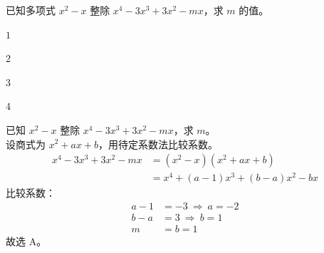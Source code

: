\documentclass[12pt,a4paper]{exam-zh}
\begin{document}
\newpage





\begin{question}
    已知多项式 $x^{2}-x$ 整除 $x^{4}-3x^{3}+3x^{2}-mx$，求 $m$ 的值。\paren[A]
    \begin{choices}
        \item $1$
        \item $2$
        \item $3$
        \item $4$
    \end{choices}
\end{question}

\begin{solution}
    已知 $x^{2}-x$ 整除 $x^{4}-3x^{3}+3x^{2}-mx$，求 $m$。 \\
    设商式为 $x^{2}+ax+b$，用待定系数法比较系数。
    \begin{align*}
        x^{4}-3x^{3}+3x^{2}-mx &= (x^{2}-x)(x^{2}+ax+b) \\
        &= x^{4}+(a-1)x^{3}+(b-a)x^{2}-bx
    \end{align*}
    比较系数：
    \begin{align*}
        a-1 &= -3 \ \Rightarrow \ a=-2 \\
        b-a &= 3 \ \Rightarrow \ b=1 \\
        m &= b = 1
    \end{align*}
    故选 A。
\end{solution}


\end{document}
